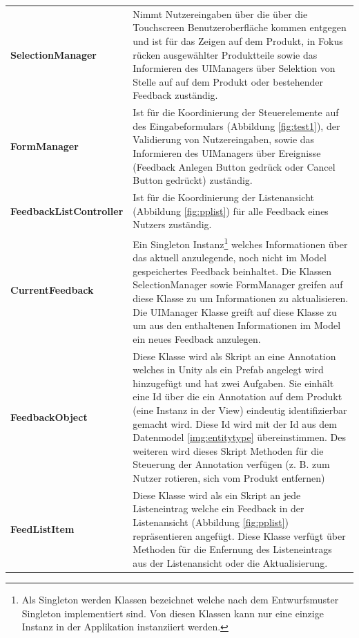 \vspace{4mm}
\begin{tabularx}{\textwidth}{l X}
	\vspace{1mm}\textbf{SelectionManager} & Nimmt Nutzereingaben über die über die Touchscreen Benutzeroberfläche kommen entgegen und ist für das Zeigen auf dem Produkt, in Fokus rücken ausgewählter Produktteile sowie das Informieren des UIManagers über Selektion von Stelle auf auf dem Produkt oder bestehender Feedback zuständig.\\
	\vspace{1mm}\textbf{FormManager} & Ist für die Koordinierung der Steuerelemente auf des Eingabeformulars (Abbildung \ref{fig:test1}), der Validierung von Nutzereingaben, sowie das Informieren des UIManagers über Ereignisse (Feedback Anlegen Button gedrück oder Cancel Button gedrückt) zuständig. \\
	\vspace{1mm}\textbf{FeedbackListController}  & Ist für die Koordinierung der Listenansicht (Abbildung \ref{fig:pplist}) für alle Feedback eines Nutzers zuständig.\\
	\vspace{1mm}\textbf{CurrentFeedback}  & Ein Singleton Instanz\footnote{Als Singleton werden Klassen bezeichnet welche nach dem Entwurfsmuster Singleton implementiert sind. Von diesen Klassen kann nur eine einzige Instanz in der Applikation instanziiert werden.} welches Informationen über das aktuell anzulegende, noch nicht im Model gespeichertes Feedback beinhaltet. Die Klassen SelectionManager sowie FormManager greifen auf diese Klasse zu um Informationen zu aktualisieren. Die UIManager Klasse greift auf diese Klasse zu um aus den enthaltenen Informationen im Model ein neues Feedback anzulegen.\\
	\vspace{1mm}\textbf{FeedbackObject}  & Diese Klasse wird als Skript an eine Annotation welches in Unity als ein Prefab angelegt wird hinzugefügt und hat zwei Aufgaben. Sie einhält eine Id über die ein Annotation auf dem Produkt (eine Instanz in der View) eindeutig identifizierbar gemacht wird. Diese Id wird mit der Id aus dem Datenmodel \ref{img:entitytype} übereinstimmen. Des weiteren wird dieses Skript Methoden für die Steuerung der Annotation verfügen (z. B. zum Nutzer rotieren, sich vom Produkt entfernen)\\
	\vspace{1mm}\textbf{FeedListItem} & Diese Klasse wird als ein Skript an jede Listeneintrag welche ein Feedback in der Listenansicht (Abbildung \ref{fig:pplist}) repräsentieren angefügt. Diese Klasse verfügt über Methoden für die Enfernung des Listeneintrags aus der Listenansicht oder die Aktualisierung. \\

\end{tabularx}
